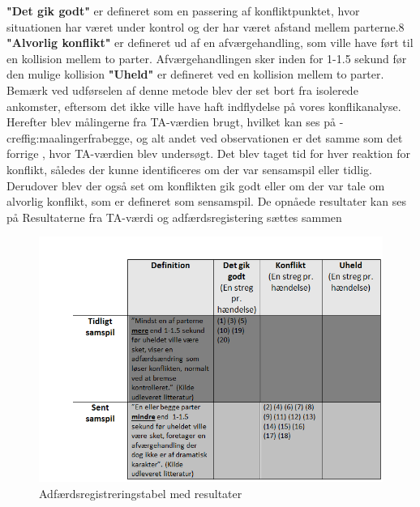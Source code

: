 \textbf{"Det	gik	godt"} er defineret som en passering af konfliktpunktet, hvor situationen
har	været under kontrol og der har været afstand mellem parterne.8
\textbf{"Alvorlig konflikt"}	er defineret ud af en afværgehandling, som ville have ført til en kollision mellem to parter. Afværgehandlingen sker inden for 1-1.5 sekund før den mulige	kollision%
\textbf{"Uheld"} er defineret ved en kollision mellem to parter.
Bemærk ved udførselen af denne metode blev der set bort fra isolerede ankomster, eftersom det ikke ville have haft indflydelse på vores konflikanalyse. Herefter blev målingerne fra TA-værdien brugt, hvilket kan ses på -cref{fig:maalingerfrabegge}, og alt andet ved observationen er det samme som det forrige %
, hvor TA-værdien blev undersøgt.
Det blev taget tid for hver reaktion for konflikt, således der kunne identificeres om der var sensamspil eller tidlig. Derudover blev der også set om konflikten gik godt eller om der var tale om alvorlig konflikt, som er defineret som sensamspil. De opnåede resultater kan ses på %
Resultaterne fra TA-værdi og adfærdsregistering sættes sammen
\begin{figure}[htbp]
  \centering
  \begin{adjustbox}{max width=\textwidth}
    \includegraphics{figures/Billederogfigur/obstabelresult.png} %
 \end{adjustbox}
  \caption{Adfærdsregistreringstabel med resultater}
  \label{fig:adfregtabelresult}
\end{figure}
